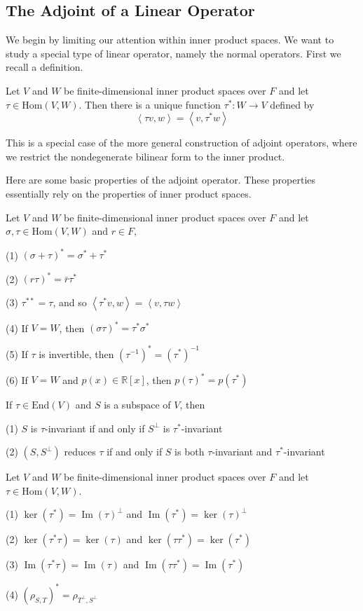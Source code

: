\subsection{The Adjoint of a Linear Operator}
We begin by limiting our attention within inner product spaces. We want to study a special type of linear operator, namely the normal operators. First we recall a definition.
\begin{definition}
Let $V$ and $W$ be finite-dimensional inner product spaces over $F$ and let $\tau\in \text{Hom}(V,W)$. Then there is a unique function $\tau^*:W\to V$ defined by \[\left \langle\tau v,w \right \rangle =\left \langle v,\tau^*w \right \rangle  \]
\end{definition}
\begin{remark}
This is a special case of the more general construction of adjoint operators, where we restrict the nondegenerate bilinear form to the inner product.
\end{remark}
Here are some basic properties of the adjoint operator. These properties essentially rely on the properties of inner product spaces.
\begin{theorem}
Let $V$ and $W$ be finite-dimensional inner product spaces over $F$ and let $\sigma,\tau\in \text{Hom}(V,W)$ and $r\in F$,\par
(1) $(\sigma+\tau)^*=\sigma^*+\tau^*$\par
(2) $(r\tau)^*=\bar{r}\tau^*$\par
(3) $\tau^{**}=\tau$, and so $\left \langle\tau^* v,w \right \rangle =\left \langle v,\tau w \right \rangle $ \par
(4) If $V=W$, then $(\sigma\tau)^*=\tau^*\sigma^*$ \par
(5) If $\tau$ is invertible, then $(\tau^{-1})^*=(\tau^*)^{-1}$\par
(6) If $V=W$ and $p(x)\in\mathbb{R}[x]$, then $p(\tau)^*=p(\tau^*)$\par
\end{theorem}
\begin{theorem}
If $\tau\in \text{End}(V)$ and $S$ is a subspace of $V$, then\par
(1) $S$ is $\tau$-invariant if and only if $S^\perp$ is $\tau^*$-invariant \par
(2) $(S,S^\perp)$ reduces $\tau$ if and only if $S$ is both $\tau$-invariant and $\tau^*$-invariant
\end{theorem}
\begin{theorem}
Let $V$ and $W$ be finite-dimensional inner product spaces over $F$ and let $\tau\in \text{Hom}(V,W)$. \par
(1) $\ker(\tau^*)=\operatorname{Im}(\tau)^\perp$ and $\operatorname{Im}(\tau^*)=\ker(\tau)^\perp$ \par
(2) $\ker(\tau^*\tau)=\ker(\tau)$ and $\ker(\tau\tau^*)=\ker(\tau^*)$ \par
(3) $\operatorname{Im}(\tau^*\tau)=\operatorname{Im}(\tau)$ and $\operatorname{Im}(\tau\tau^*)=\operatorname{Im}(\tau^*)$ \par
(4) $(\rho_{S,T})^*=\rho_{T^\perp,S^\perp}$
\end{theorem}

